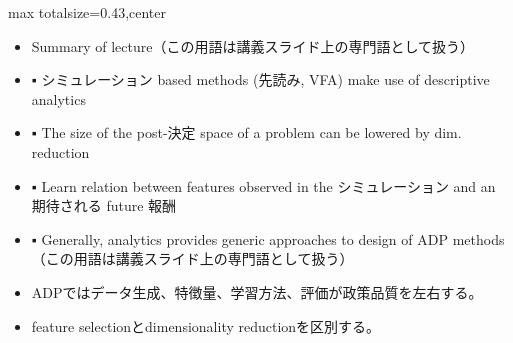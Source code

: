 \clearpage
{}
\begin{minipage}[t]{0.405\textwidth}
\begin{adjustbox}{max totalsize={\textwidth}{0.43\textheight},center}
\begin{minipage}{\textwidth}\scriptsize
{}\begin{itemize}
\item Summary of lecture（この用語は講義スライド上の専門語として扱う）
\item ▪ シミュレーション based methods (先読み, VFA) make use of descriptive analytics
\item ▪ The size of the post-決定 space of a problem can be lowered by dim. reduction
\item ▪ Learn relation between features observed in the シミュレーション and an 期待される future 報酬
\item ▪ Generally, analytics provides generic approaches to design of ADP methods（この用語は講義スライド上の専門語として扱う）
\end{itemize}\begin{itemize}
\item ADPではデータ生成、特徴量、学習方法、評価が政策品質を左右する。
\item feature selectionとdimensionality reductionを区別する。
\end{itemize}
\end{minipage}
\end{adjustbox}
\end{minipage}\hfill
